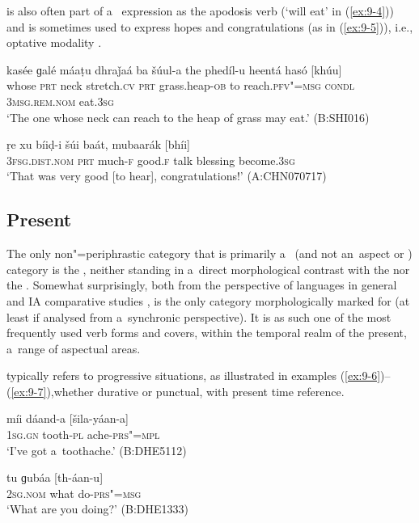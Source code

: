  is also often part of a~ expression as the apodosis verb (`will eat' in (\ref{ex:9-4})) and is sometimes used to express hopes and congratulations (as in (\ref{ex:9-5})), i.e., optative modality \citep[179]{bybeeetal1994}.

\begin{exe}
\ex
\label{ex:9-4}
\gll kasée ɡalé máaṭu dhraǰaá ba šúul-a the phedíl-u heentá hasó [khúu] \\
whose \textsc{prt} neck stretch.\textsc{cv} \textsc{prt} grass.heap-\textsc{ob}  to reach.\textsc{pfv"=msg } \textsc{condl} \textsc{3msg.rem.nom} eat.\textsc{3sg} \\
\glt `The one whose neck can reach to the heap of grass may eat.' (B:SHI016)

\ex
\label{ex:9-5}
\gll ṛe xu bíiḍ-i šúi baát, mubaarák [bhíi] \\
\textsc{3fsg.dist.nom} \textsc{prt} much-\textsc{f} good.\textsc{f} talk blessing  become.\textsc{3sg} \\
\glt `That was very good [to hear], congratulations!' (A:CHN070717)
\end{exe}

\subsection{Present}
\label{subsec:9-1-3}

The only non"=periphrastic category that is primarily a~ (and not an~aspect or ) category is the , neither standing in a~direct morphological contrast with the  nor the . Somewhat surprisingly, both from the perspective of languages in general \citep[103--128]{dahl1985} and IA comparative studies \citep[282, 288--289]{masica1991},  is the only category morphologically marked for  (at least if analysed from a~synchronic perspective). It is as such one of the most frequently used verb forms and covers, within the temporal realm of the present, a~range of aspectual areas. 



 typically refers to progressive situations, as illustrated in examples (\ref{ex:9-6})--(\ref{ex:9-7}),whether durative or punctual, with present time reference.

\begin{exe}
\ex
\label{ex:9-6}
\gll míi dáand-a [šila-yáan-a] \\
\textsc{1sg.gn} tooth-\textsc{pl} ache-\textsc{prs"=mpl} \\
\glt `I've got a~toothache.' (B:DHE5112)

\ex
\label{ex:9-7}
\gll tu ɡubáa [th-áan-u] \\
\textsc{2sg.nom} what do-\textsc{prs"=msg} \\
\glt `What are you doing?' (B:DHE1333)
\end{exe}

